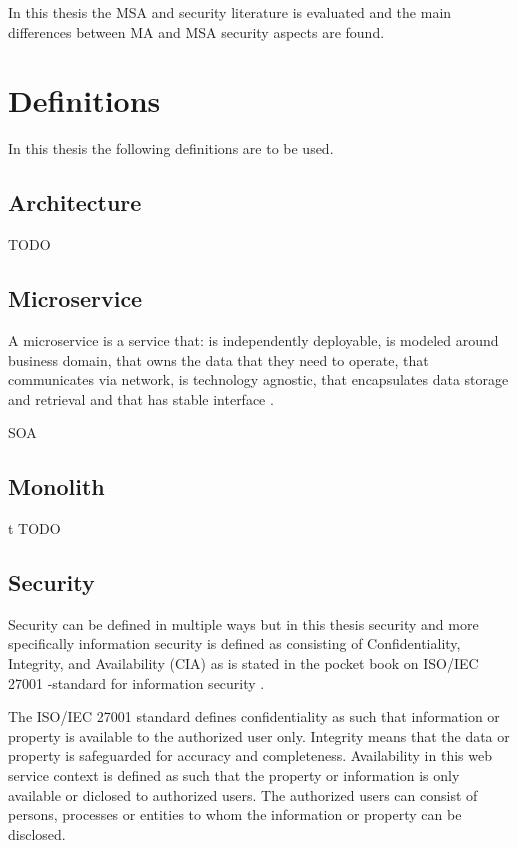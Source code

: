 In this thesis the MSA and security literature is evaluated and the main differences between
MA and MSA security aspects are found.





\section{Definitions}

In this thesis the following definitions are to be used.

\subsection{Architecture}

TODO


\subsection{Microservice}

A microservice is a service that: is independently deployable,
is modeled around business domain,
that owns the data that they need to operate,
that communicates via network,
is technology agnostic,
that encapsulates data storage and retrieval and 
that has stable interface \citep{newman2019}.

SOA

\subsection{Monolith}
t
TODO

\subsection{Security}

Security can be defined in multiple ways but in this thesis security 
and more specifically information security is defined as consisting of 
Confidentiality, Integrity, and Availability (CIA) as is stated in the 
pocket book on ISO/IEC 27001 -standard for information security \citep{isoiec27001}.

The ISO/IEC 27001 standard defines confidentiality as such that information or property 
is available to the authorized user only.
Integrity means that the data or property is safeguarded for accuracy and completeness.
Availability in this web service context is defined as such that the property or information 
is only available or diclosed to authorized users.
The authorized users can consist of persons, processes or entities to whom 
the information or property can be disclosed.


